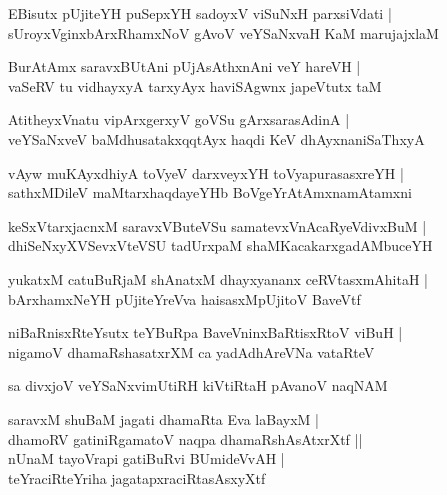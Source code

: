 \documentclass[twoside,12pt,openright]{book}
\newcounter{shloka}[chapter]
\begin{document}
\begin{shloka}%
EBisutx pUjiteYH puSepxYH sadoyxV viSuNxH parxsiVdati |\\
sUroyxVginxbArxRhamxNoV gAvoV veYSaNxvaH KaM marujajxlaM 
\end{shloka}

\begin{shloka}%
BurAtAmx saravxBUtAni pUjAsAthxnAni veY hareVH |\\
vaSeRV tu vidhayxyA tarxyAyx haviSAgwnx japeVtutx taM 
\end{shloka}

\begin{shloka}%
AtitheyxVnatu vipArxgerxyV goVSu gArxsarasAdinA |\\
veYSaNxveV baMdhusatakxqqtAyx haqdi KeV dhAyxnaniSaThxyA 
\end{shloka}

\begin{shloka}%
vAyw muKAyxdhiyA toVyeV darxveyxYH toVyapurasasxreYH |\\
sathxMDileV maMtarxhaqdayeYHb BoVgeYrAtAmxnamAtamxni
\end{shloka}

\begin{shloka}%
keSxVtarxjacnxM saravxVButeVSu samatevxVnAcaRyeVdivxBuM |\\
dhiSeNxyXVSevxVteVSU tadUrxpaM shaMKacakarxgadAMbuceYH 
\end{shloka}

\begin{shloka}%
yukatxM catuBuRjaM shAnatxM dhayxyananx ceRVtasxmAhitaH |\\
bArxhamxNeYH pUjiteYreVva haisasxMpUjitoV BaveVtf 
\end{shloka}

\begin{shloka}%
niBaRnisxRteYsutx teYBuRpa BaveVninxBaRtisxRtoV viBuH |\\
nigamoV dhamaRshasatxrXM ca yadAdhAreVNa vataRteV 
\end{shloka}

\begin{shloka}%
sa divxjoV veYSaNxvimUtiRH kiVtiRtaH pAvanoV naqNAM 
\end{shloka}

\begin{shloka}%
saravxM shuBaM jagati dhamaRta Eva laBayxM |\\
dhamoRV gatiniRgamatoV naqpa dhamaRshAsAtxrXtf ||\\
nUnaM tayoVrapi gatiBuRvi BUmideVvAH |\\
teYraciRteYriha jagatapxraciRtasAsxyXtf
\end{shloka}
\end{document}
